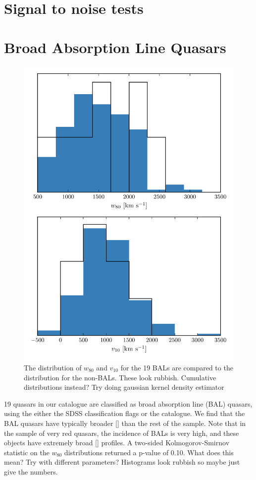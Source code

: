\section{Signal to noise tests}


\section{Broad Absorption Line Quasars}

\begin{figure}
    \centering
    \includegraphics[width=0.8\linewidth]{figures/chapter04/bal_hists.pdf} 
    \caption{The distribution of $w_{80}$ and $v_{10}$ for the 19 BALs are compared to the distribution for the non-BALs. These look rubbish. Cumulative distributions instead? Try doing gaussian kernel density estimator}     
    \label{fig:bal_hists}
\end{figure}

19 quasars in our catalogue are classified as broad absorption line (BAL) quasars, using the either the SDSS classification flags or the \citet{allen11} catalogue. 
We find that the BAL quasars have typically broader [] than the rest of the sample. 
Note that in the \citet{zakamska16} sample of very red quasars, the incidence of BALs is very high, and these objects have extremely broad [] profiles. 
A two-sided Kolmogorov-Smirnov statistic on the $w_{80}$ distributions returned a p-value of 0.10. 
What does this mean?
Try with different parameters?
Histograms look rubbish so maybe just give the numbers. 

